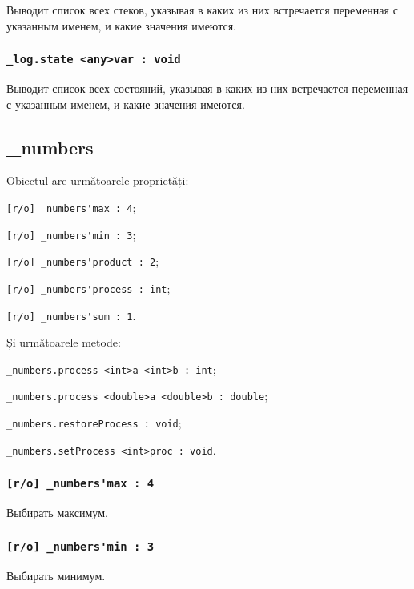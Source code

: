 Выводит список всех стеков, указывая в каких из них встречается переменная с указанным именем, и какие значения имеются.

\subsubsection{\lstinline|_log.state <any>var : void|}

Выводит список всех состояний, указывая в каких из них встречается переменная с указанным именем, и какие значения имеются.

\subsection{{\color{orange} \_numbers}}

Obiectul \numbers{} are următoarele proprietăți:
\begin{icItems}
	\item \lstinline|[r/o] _numbers'max : 4|;
	\item \lstinline|[r/o] _numbers'min : 3|;
	\item \lstinline|[r/o] _numbers'product : 2|;
	\item \lstinline|[r/o] _numbers'process : int|;
	\item \lstinline|[r/o] _numbers'sum : 1|.
\end{icItems}

Și următoarele metode:
\begin{icItems}
	\item \lstinline|_numbers.process <int>a <int>b : int|;
	\item \lstinline|_numbers.process <double>a <double>b : double|;
	\item \lstinline|_numbers.restoreProcess : void|;
	\item \lstinline|_numbers.setProcess <int>proc : void|.
\end{icItems}

\subsubsection{\lstinline|[r/o] _numbers'max : 4|}

Выбирать максимум.

\subsubsection{\lstinline|[r/o] _numbers'min : 3|}

Выбирать минимум.


